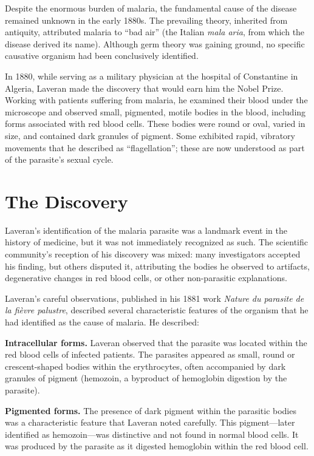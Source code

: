 Despite the enormous burden of malaria, the fundamental cause of the disease remained unknown in the early 1880s. The prevailing theory, inherited from antiquity, attributed malaria to ``bad air'' (the Italian \emph{mala aria}, from which the disease derived its name). Although germ theory was gaining ground, no specific causative organism had been conclusively identified.

In 1880, while serving as a military physician at the hospital of Constantine in Algeria, Laveran made the discovery that would earn him the Nobel Prize. Working with patients suffering from malaria, he examined their blood under the microscope and observed small, pigmented, motile bodies in the blood, including forms associated with red blood cells. These bodies were round or oval, varied in size, and contained dark granules of pigment. Some exhibited rapid, vibratory movements that he described as ``flagellation''; these are now understood as part of the parasite's sexual cycle.

\section{The Discovery}

Laveran's identification of the malaria parasite was a landmark event in the history of medicine, but it was not immediately recognized as such. The scientific community's reception of his discovery was mixed: many investigators accepted his finding, but others disputed it, attributing the bodies he observed to artifacts, degenerative changes in red blood cells, or other non-parasitic explanations.

Laveran's careful observations, published in his 1881 work \emph{Nature du parasite de la fi\`evre palustre}, described several characteristic features of the organism that he had identified as the cause of malaria. He described:

\textbf{Intracellular forms.} Laveran observed that the parasite was located within the red blood cells of infected patients. The parasites appeared as small, round or crescent-shaped bodies within the erythrocytes, often accompanied by dark granules of pigment (hemozoin, a byproduct of hemoglobin digestion by the parasite).

\textbf{Pigmented forms.} The presence of dark pigment within the parasitic bodies was a characteristic feature that Laveran noted carefully. This pigment---later identified as hemozoin---was distinctive and not found in normal blood cells. It was produced by the parasite as it digested hemoglobin within the red blood cell.

